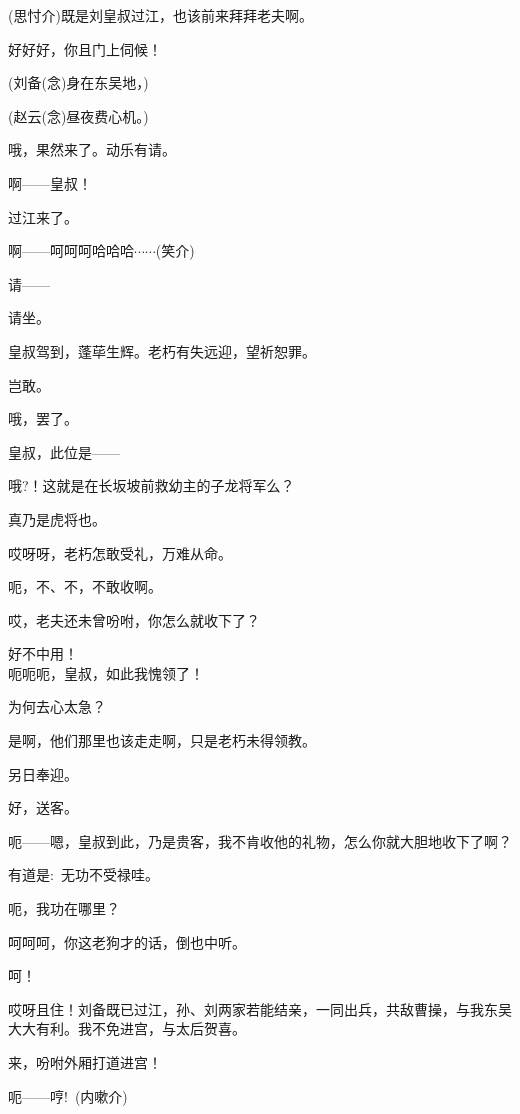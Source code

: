 {(思忖{\hwfs 介})既是刘皇叔过江，也该前来拜拜老夫啊。

好好好，你且门上伺候！

(刘备\hspace{30pt}({\akai 念})身在东吴地，)

(赵云\hspace{30pt}({\akai 念})昼夜费心机。)

哦，果然来了。动乐有请。

啊------皇叔！

过江来了。

啊------呵呵呵哈哈哈$\cdots{}\cdots{}$({\hwfs 笑介})

请------

请坐。

皇叔驾到，蓬荜生辉。老朽有失远迎，望祈恕罪。

岂敢。

哦，罢了。

皇叔，此位是------

哦?！这就是在长坂坡前救幼主的子龙将军么？

真乃是虎将也。

哎呀呀，老朽怎敢受礼，万难从命。

呃，不、不，不敢收啊。

哎，老夫还未曾吩咐，你怎么就收下了？

好不中用！\\

呃呃呃，皇叔，如此我愧领了！

为何去心太急？

是啊，他们那里也该走走啊，只是老朽未得领教。

另日奉迎。

好，送客。

呃------嗯，皇叔到此，乃是贵客，我不肯收他的礼物，怎么你就大胆地收下了啊？

有道是:~无功不受禄哇。

呃，我功在哪里？

呵呵呵，你这老狗才的话，倒也中听。

呵！

哎呀且住！刘备既已过江，孙、刘两家若能结亲，一同出兵，共敌曹操，与我东吴大大有利。我不免进宫，与太后贺喜。

来，吩咐外厢打道进宫！

\vspace{5pt}

{呃------哼!~({\hwfs 内嗽介})}

}
